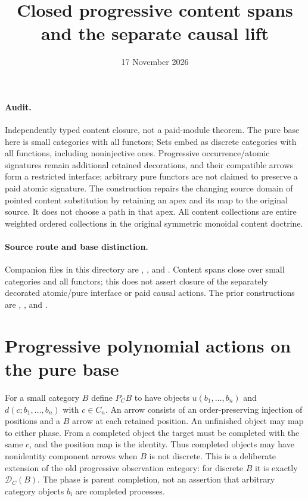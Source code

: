 \documentclass[11pt]{article}
\title{Closed progressive content spans and the separate causal lift}
\date{17 November 2026}
\begin{document}
\maketitle
\paragraph{Audit.} Independently typed content closure, not a paid-module theorem. The pure base here is small categories with all functors; Sets embed as discrete categories with all functions, including noninjective ones. Progressive occurrence/atomic signatures remain additional retained decorations, and their compatible arrows form a restricted interface; arbitrary pure functors are not claimed to preserve a paid atomic signature. The construction repairs the changing source domain of pointed content substitution by retaining an apex and its map to the original source. It does not choose a path in that apex. All content collections are entire weighted ordered collections in the original symmetric monoidal content doctrine.

\paragraph{Source route and base distinction.} Companion files in this directory are \texttt{}, \texttt{}, and \texttt{}. Content spans close over small categories and all functors; this does not assert closure of the separately decorated atomic/pure interface or paid causal actions. The prior constructions are \texttt{}, \texttt{}, and \texttt{}.

\section{Progressive polynomial actions on the pure base}
For a small category $B$ define $P_CB$ to have objects $u(b_1,\ldots,b_n)$ and $d(c;b_1,\ldots,b_n)$ with $c\in C_n$. An arrow consists of an order-preserving injection of positions and a $B$ arrow at each retained position. An unfinished object may map to either phase. From a completed object the target must be completed with the same $c$, and the position map is the identity. Thus completed objects may have nonidentity component arrows when $B$ is not discrete. This is a deliberate extension of the old progressive observation category: for discrete $B$ it is exactly $\mathcal D_C(B)$. The phase is parent completion, not an assertion that arbitrary category objects $b_i$ are completed processes.
\end{document}
